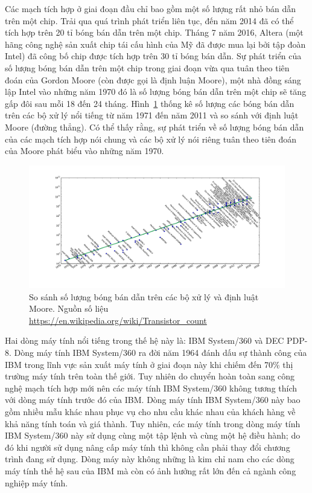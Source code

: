 Các mạch tích hợp ở giai đoạn đầu chỉ bao gồm một số lượng rất nhỏ bán dẫn trên một chip. Trải qua quá trình phát triển liên tục, đến năm 2014 đã có thể tích hợp trên 20 tỉ bóng bán dẫn trên một chip. Tháng 7 năm 2016, Altera (một hãng công nghệ sản xuất chip tái cấu hình của Mỹ đã được mua lại bởi tập đoàn Intel) đã công bố chip được tích hợp trên 30 tỉ bóng bán dẫn. Sự phát triển của số lượng bóng bán dẫn trên một chip trong giai đoạn vừa qua tuân theo tiên đoán của Gordon Moore (còn được gọi là định luận Moore), một nhà đồng sáng lập Intel vào những năm 1970 đó là số lượng bóng bán dẫn trên một chip sẽ tăng gấp đôi sau mỗi 18 đến 24 tháng. Hình~\ref{fig:Transistor_Count} thống kê số lượng các bóng bán dẫn trên các bộ xử lý nổi tiếng từ năm 1971 đến năm 2011 và so sánh với định luật Moore (đường thẳng). Có thể thấy rằng, sự phát triển về số lượng bóng bán dẫn của các mạch tích hợp nói chung và các bộ xử lý nói riêng tuân theo tiên đoán của Moore phát biểu vào những năm 1970.

\begin{figure}
	\centering
		\includegraphics[width=1.0\columnwidth]{chapter01/figure/transistors}
		\centering
	\caption{So sánh số lượng bóng bán dẫn trên các bộ xử lý và định luật Moore. Nguồn số liệu \url{https://en.wikipedia.org/wiki/Transistor_count}}
	\label{fig:Transistor_Count}
\end{figure}

Hai dòng máy tính nổi tiếng trong thế hệ này là: IBM System/360 và DEC PDP-8. Dòng máy tính IBM System/360 ra đời năm 1964 đánh dấu sự thành công của IBM trong lĩnh vực sản xuất máy tính ở giai đoạn này khi chiếm đến 70\% thị trường máy tính trên toàn thế giới. Tuy nhiên do chuyển hoàn toàn sang công nghệ mạch tích hợp mới nên các máy tính IBM System/360 không tương thích với dòng máy tính trước đó của IBM. Dòng máy tính IBM System/360 này bao gồm nhiều mẫu khác nhau phục vụ cho nhu cầu khác nhau của khách hàng về khả năng tính toán và giá thành. Tuy nhiên, các máy tính trong dòng máy tính IBM System/360 này sử dụng cùng một tập lệnh và cùng một hệ điều hành; do đó khi người sử dụng nâng cấp máy tính thì không cần phải thay đổi chương trình đang sử dụng. Dòng máy này không những là kim chỉ nam cho các dòng máy tính thế hệ sau của IBM mà còn có ảnh hưởng rất lớn đến cả ngành công nghiệp máy tính.

